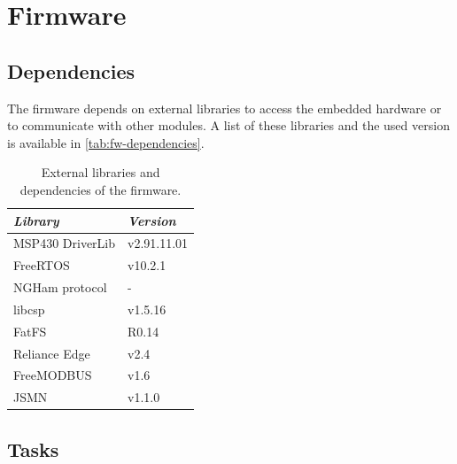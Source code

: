 %
%
%
%
%

%
%
%
%
%
%

\chapter{Firmware} \label{ch:firmware}

\section{Dependencies}

The firmware depends on external libraries to access the embedded hardware or to communicate with other modules. A list of these libraries and the used version is available in \autoref{tab:fw-dependencies}.

\begin{table}[!h]
    \centering
    \begin{tabular}{L{5cm}R{4cm}}
        \toprule[1.5pt]
        \textit{Library}        & \textit{Version} \\
        \midrule
            MSP430 DriverLib    & v2.91.11.01 \\
            FreeRTOS            & v10.2.1 \\
            NGHam protocol      & - \\
            libcsp              & v1.5.16 \\
            FatFS               & R0.14 \\
            Reliance Edge       & v2.4 \\
            FreeMODBUS          & v1.6 \\
            JSMN                & v1.1.0 \\
        \bottomrule[1.5pt]
    \end{tabular}
    \caption{External libraries and dependencies of the firmware.}
    \label{tab:fw-dependencies}
\end{table}

\section{Tasks}

